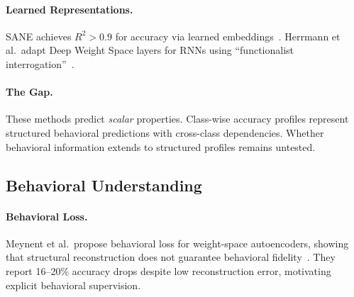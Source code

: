 \paragraph{Learned Representations.} SANE achieves $R^2 > 0.9$ for accuracy via learned embeddings~\cite{schurholt2024sane}. Herrmann et al.\ adapt Deep Weight Space layers for RNNs using ``functionalist interrogation''~\cite{herrmann2024rnn}.

\paragraph{The Gap.} These methods predict \emph{scalar} properties. Class-wise accuracy profiles represent structured behavioral predictions with cross-class dependencies. Whether behavioral information extends to structured profiles remains untested.

\subsection{Behavioral Understanding}

\paragraph{Behavioral Loss.} Meynent et al.\ propose behavioral loss for weight-space autoencoders, showing that structural reconstruction does not guarantee behavioral fidelity~\cite{meynent2025behavior}. They report 16--20\% accuracy drops despite low reconstruction error, motivating explicit behavioral supervision.
